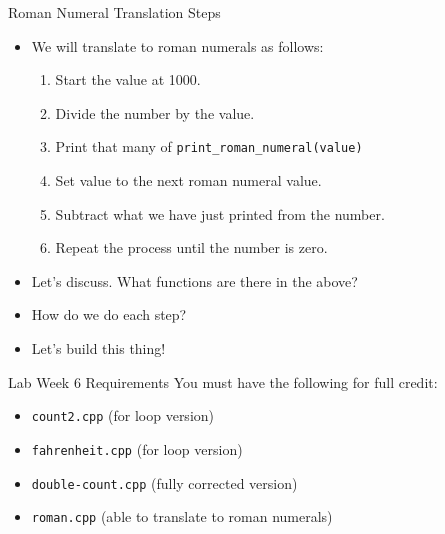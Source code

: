 \documentclass[]{beamer}
\begin{document}
\begin{frame}{Roman Numeral Translation Steps}
    \begin{itemize}[<+->]
        \item We will translate to roman numerals as follows:
        \begin{enumerate}
            \item Start the value at 1000.
            \item Divide the number by the value.
            \item Print that many of \texttt{print\_roman\_numeral(value)}
            \item Set value to the next roman numeral value.
            \item Subtract what we have just printed from the number.
            \item Repeat the process until the number is zero.
        \end{enumerate}

        \item Let's discuss.  What functions are there in the above?
        \item How do we do each step?
        \item Let's build this thing!
    \end{itemize}
\end{frame}

\begin{frame}{Lab Week 6 Requirements}
    You must have the following for full credit:
    \begin{itemize}
        \item \texttt{count2.cpp} (for loop version)
        \item \texttt{fahrenheit.cpp} (for loop version)
        \item \texttt{double-count.cpp} (fully corrected version)
        \item \texttt{roman.cpp} (able to translate to roman numerals)
    \end{itemize}
\end{frame}
\end{document}
